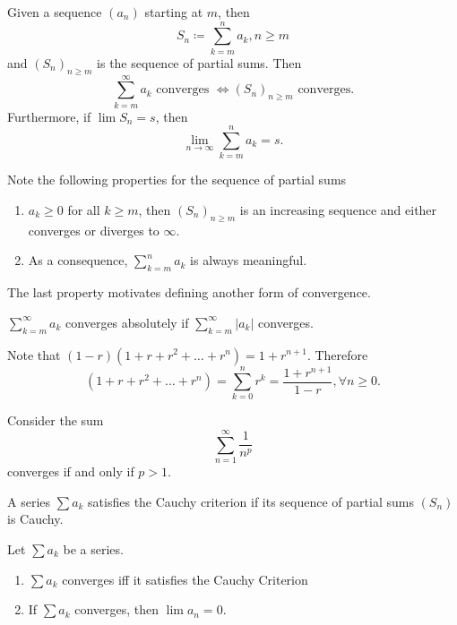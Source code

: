 \documentclass[../notes.tex]{subfiles}
\begin{document}

\begin{definition}[Summation]
    Given a sequence $(a_n)$ starting at $m$, then
    \[
        S_n \coloneq \sum_{k = m}^{n} a_k, n \geq m
    \]
    and $(S_n)_{n \geq m}$ is the sequence of partial sums. Then
    \[
        \sum_{k = m}^\infty a_k \text{ converges } \Leftrightarrow (S_n)_{n \geq m} \text{ converges.}
    \]
    Furthermore, if $\lim S_n = s$, then
    \[
        \lim_{n\to \infty} \sum_{k = m}^n a_k = s
    .\]
\end{definition}
\begin{remark}
    Note the following properties for the sequence of partial sums
    \begin{enumerate}[label=\alph*)]
        \item $a_k \geq 0$ for all $k \geq m$, then $(S_n)_{n \geq m}$ is an increasing sequence and either converges or diverges to $\infty$.
        \item As a consequence, $\displaystyle \sum_{k = m}^n a_k$ is always meaningful.
    \end{enumerate}
\end{remark}

The last property motivates defining another form of convergence.

\begin{definition}
    $\displaystyle \sum_{k = m}^\infty a_k$ converges absolutely if $\displaystyle \sum_{k=m}^\infty |a_k|$ converges.
\end{definition}

\begin{example}
    Note that $(1-r)(1 + r + r^2 + \ldots + r^n) = 1 + r^{n+1}$. Therefore
    \[
        (1 + r + r^2 + \ldots + r^n) = \sum_{k = 0}^n r^k = \frac{1 + r^{n+1}}{1-r}, \forall n \geq 0
    .\]
\end{example}

\begin{example}
    Consider the sum
    \[
        \sum_{n = 1}^{\infty} \frac{1}{n^p}
    \]
    converges if and only if $p > 1$.
\end{example}

\begin{definition}
    A series $\sum a_k$ satisfies the Cauchy criterion if its sequence of partial sums $(S_n)$ is Cauchy.
\end{definition}

\begin{theorem}
    \label{thm:cauchycriterion}
    Let $\sum a_k$ be a series.
    \begin{enumerate}
        \item $\sum a_k$ converges iff it satisfies the Cauchy Criterion
        \item If $\sum a_k$ converges, then $\lim a_n = 0$.
    \end{enumerate}
\end{theorem}
\end{document}
